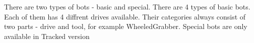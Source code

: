 There are two types of bots - basic and special.
There are 4 types of basic bots. Each of them has 4 diffrent drives available.
Their categories always consist of two parts - drive and tool, for example WheeledGrabber.
Special bots are only available in Tracked version